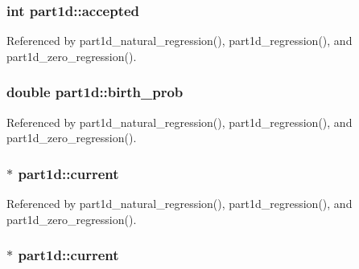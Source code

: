 \subsubsection[{\texorpdfstring{accepted}{accepted}}]{\setlength{\rightskip}{0pt plus 5cm}int part1d\+::accepted}\hypertarget{structpart1d_a837610d0363ea94ac1535788d9cc8b91}{}\label{structpart1d_a837610d0363ea94ac1535788d9cc8b91}


Referenced by part1d\+\_\+natural\+\_\+regression(), part1d\+\_\+regression(), and part1d\+\_\+zero\+\_\+regression().

\subsubsection[{\texorpdfstring{birth\+\_\+prob}{birth_prob}}]{\setlength{\rightskip}{0pt plus 5cm}double part1d\+::birth\+\_\+prob}\hypertarget{structpart1d_af2cb7c8f0b1a14c4850c3f2a99f696e2}{}\label{structpart1d_af2cb7c8f0b1a14c4850c3f2a99f696e2}


Referenced by part1d\+\_\+natural\+\_\+regression(), part1d\+\_\+regression(), and part1d\+\_\+zero\+\_\+regression().

\subsubsection[{\texorpdfstring{current}{current}}]{$\ast$ part1d\+::current}\hypertarget{structpart1d_adaa79f60cbc59525faa8f33e5f451613}{}\label{structpart1d_adaa79f60cbc59525faa8f33e5f451613}


Referenced by part1d\+\_\+natural\+\_\+regression(), part1d\+\_\+regression(), and part1d\+\_\+zero\+\_\+regression().

\subsubsection[{\texorpdfstring{current}{current}}]{$\ast$ part1d\+::current}\hypertarget{structpart1d_a52e178e6ba831028417223d0d9f95dd2}{}\label{structpart1d_a52e178e6ba831028417223d0d9f95dd2}
